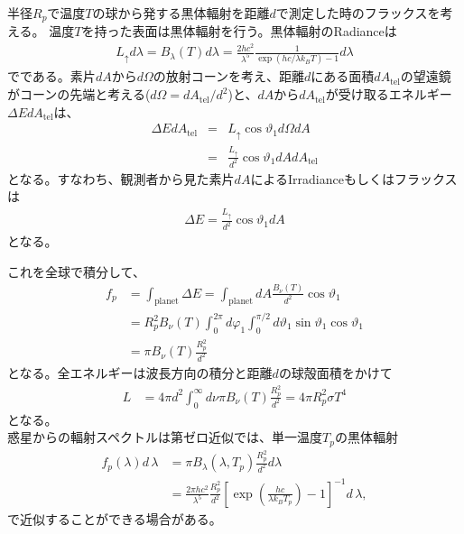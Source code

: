 半径$R_p$で温度$T$の球から発する黒体輻射を距離$d$で測定した時のフラックスを考える。
温度$T$を持った表面は黒体輻射を行う。黒体輻射のRadianceは
\begin{align}
L_{\uparrow} d \lambda = B_\lambda (T) d \lambda = \frac{2 h c^2}{\lambda^5} \frac{1}{\exp{(hc/\lambda k_B T)}-1} d \lambda
\end{align}
でである。素片$d A$から$d \Omega$の放射コーンを考え、距離$d$にある面積$d A_\mathrm{tel}$の望遠鏡がコーンの先端と考える($d \Omega = d A_\mathrm{tel}/d^2$)と、$d A$から$d A_\mathrm{tel}$が受け取るエネルギー$\Delta E d A_\mathrm{tel}$は、
\begin{eqnarray}
\label{eq:brdfdef3}
\Delta E d A_\mathrm{tel} &=& L_\uparrow \cos{\vartheta_1} d \Omega d A \\
&=& \frac{L_\uparrow}{d^2} \cos{\vartheta_1} d A d A_\mathrm{tel}
\end{eqnarray}
となる。すなわち、観測者から見た素片$d A$によるIrradianceもしくはフラックスは
\begin{eqnarray}
\label{eq:brdfdef6}
\Delta E = \frac{L_\uparrow}{d^2} \cos{\vartheta_1} d A
\end{eqnarray}
となる。

これを全球で積分して、
\begin{align}
\label{eq:raddef}
f_p &= \int_\mathrm{planet} \Delta E = \int_\mathrm{planet} d A \frac{B_\nu (T)}{d^2} \cos{\vartheta_1} \\
&= R_p^2 B_\nu (T) \int_0^{2 \pi} d \varphi_1 \int_0^{\pi/2} d \vartheta_1 \sin{\vartheta_1} \cos{\vartheta_1}\\
&= \pi B_\nu (T) \frac{R_p^2}{d^2}
\end{align}
となる。全エネルギーは波長方向の積分と距離$d$の球殻面積をかけて
\begin{align}
\label{eq:raddeftot}
L &= 4 \pi d^2 \int_0^{\infty} d \nu \pi B_\nu (T) \frac{R_p^2}{d^2} = 4 \pi R_p^2 \sigma T^4  
\end{align}
となる。\\


惑星からの輻射スペクトルは第ゼロ近似では、単一温度$T_p$の黒体輻射
\begin{align}
f_p (\lambda) d\, \lambda  &= \pi B_\lambda(\lambda,T_p) \frac{ R_p^2}{d^2}  d \lambda \\
&= \frac{2 \pi h c^2}{\lambda^5} \frac{ R_p^2}{d^2} \left[ \exp{ \left(\frac{h c}{\lambda k_B T_p} \right) }- 1 \right]^{-1} d\, \lambda ,
\label{eq:planckdist}
\end{align}
で近似することができる場合がある。

